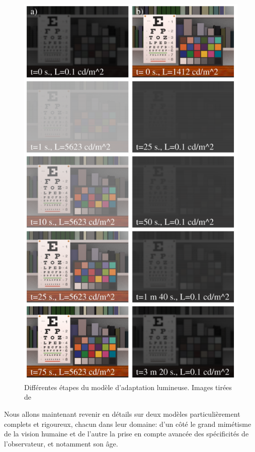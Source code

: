 	\begin{figure}
		\centering
		\includegraphics[scale=1]{Figures/FerwerdaAdaptationSteps}
		\caption{Différentes étapes du modèle d'adaptation lumineuse. Images tirées de \citep{ferwerda_model_1996}}
		\label{fig:ferwerda_adaptation_steps}
	\end{figure}
	
	\par Nous allons maintenant revenir en détails sur deux modèles particulièrement complets et rigoureux, chacun dans leur domaine: d'un côté le grand mimétisme de la vision humaine et de l'autre la prise en compte avancée des spécificités de l'observateur, et notamment son âge.
	
